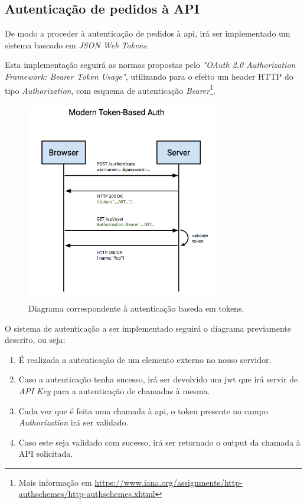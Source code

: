 
\cleardoublepage
\subsection{Autenticação de pedidos à API}

De modo a proceder à autenticação de pedidos à \gls{api}, irá ser implementado um sistema baseado em \emph{JSON Web Tokens}.

Esta implementação seguirá as normas propostas pelo \emph{"OAuth 2.0 Authorization Framework: Bearer Token Usage"}\cite{rfc6750}, utilizando para o efeito um header HTTP do tipo \emph{Authorization}, com esquema de autenticação \emph{Bearer}\footnote{Mais informação em \url{https://www.iana.org/assignments/http-authschemes/http-authschemes.xhtml}}.

\begin{figure}[h]
    \centering
    \includegraphics[width=0.75\textwidth]{img/jwt/diagramafluxoJWT.png}
    \caption{Diagrama correspondente à autenticação baseda em tokens. \cite{jwtDiagram}}
\end{figure}

O sistema de autenticação a ser implementado seguirá o diagrama previamente descrito, ou seja:

\begin{enumerate}
    \item É realizada a autenticação de um elemento externo no nosso servidor.
    \item Caso a autenticação tenha sucesso, irá ser devolvido um \gls{jwt} que irá servir de \emph{API Key} para a autenticação de chamadas à mesma.
    \item Cada vez que é feita uma chamada à \gls{api}, o token presente no campo \emph{Authorization} irá ser validado.
    \item Caso este seja validado com sucesso, irá ser retornado o output da chamada à API solicitada.
\end{enumerate}

